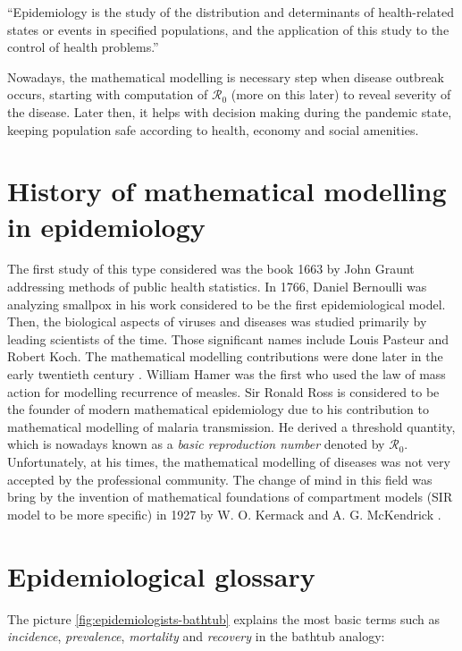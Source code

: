 \documentclass[
  digital, %
  oneside, %
  lof,     %
  lot,     %
]{fithesis4}
\begin{document}
\begin{displayquote}
  ``Epidemiology is the study of the distribution and
  determinants of health-related states or events in specified
  populations, and the application of this study to the control
  of health problems.''
\end{displayquote}

Nowadays, the mathematical modelling is necessary 
step when disease outbreak occurs, starting with computation 
of $\mathcal{R}_0$ (more on this later) to reveal severity 
of the disease.
Later then, it helps with decision 
making during the pandemic state, keeping population safe 
according to health, economy and social amenities.


\section{History of mathematical modelling in epidemiology}

The first study of this type considered was the book 1663 by 
John Graunt addressing methods of public health statistics.
In 1766, Daniel Bernoulli was analyzing smallpox in his work 
considered to be the first epidemiological model.
Then, the biological aspects of viruses and diseases was 
studied primarily by leading scientists of the time.
Those significant names include Louis Pasteur and Robert Koch.
The mathematical modelling contributions were done later in
the early twentieth century \cite[Chapter~1.4]{martcheva2015}.
William Hamer was the first who used the law of 
mass action for modelling recurrence of measles. 
Sir Ronald Ross is considered to be the founder of 
modern mathematical epidemiology due to his contribution
to mathematical modelling of malaria
transmission. He derived a threshold quantity, which is 
nowadays known as a \textit{basic reproduction number}
denoted by $\mathcal{R}_0$.
Unfortunately, at his times, the mathematical modelling 
of diseases was not very accepted by the professional community.
The change of mind in this field was bring by the invention 
of mathematical foundations of compartment models
(SIR model to be more specific) in 1927 by W. O. Kermack and 
A. G. McKendrick \cite{kermack1927}.



\section{Epidemiological glossary}

The picture \ref{fig:epidemiologists-bathtub} explains the most basic
terms such as \textit{incidence}, \textit{prevalence}, \textit{mortality}
and \textit{recovery} in the bathtub analogy:
\end{document}

